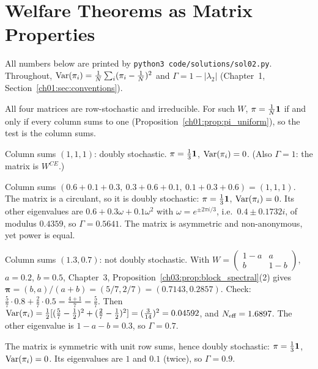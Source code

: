 \documentclass[../solutions_manual.tex]{subfiles}
\begin{document}
\ifSubfilesClassLoaded{\setcounter{chapter}{1}}{}%
\setcounter{chapter}{1}%
\chapter{Welfare Theorems as Matrix Properties}\label{sol02}
\sloppy

All numbers below are printed by \texttt{python3 code/solutions/sol02.py}. Throughout, $\operatorname{Var}(\pi_i) = \frac1N\sum_i(\pi_i - \frac1N)^2$ and $\Gamma = 1 - |\lambda_2|$ (Chapter~1, Section~\ref{ch01:sec:conventions}).


All four matrices are row-stochastic and irreducible. For such $W$, $\pi = \frac1N\mathbf{1}$ if and only if every column sums to one (Proposition~\ref{ch01:prop:pi_uniform}), so the test is the column sums.

 Column sums $(1,1,1)$: doubly stochastic. $\pi = \frac13\mathbf{1}$, $\operatorname{Var}(\pi_i) = 0$. (Also $\Gamma = 1$: the matrix is $W^{CE}$.)

 Column sums $(0.6+0.1+0.3,\ 0.3+0.6+0.1,\ 0.1+0.3+0.6) = (1, 1, 1)$. The matrix is a circulant, so it is doubly stochastic: $\pi = \frac13\mathbf{1}$, $\operatorname{Var}(\pi_i) = 0$. Its other eigenvalues are $0.6 + 0.3\omega + 0.1\omega^2$ with $\omega = e^{\pm 2\pi i/3}$, i.e.\ $0.4 \pm 0.1732i$, of modulus $0.4359$, so $\Gamma = 0.5641$. The matrix is asymmetric and non-anonymous, yet power is equal.

 Column sums $(1.3, 0.7)$: not doubly stochastic. With $W = \begin{pmatrix}1-a & a\\ b & 1-b\end{pmatrix}$, $a = 0.2$, $b = 0.5$, Chapter~3, Proposition~\ref{ch03:prop:block_spectral}(2) gives $\boldsymbol\pi = (b, a)/(a+b) = (5/7, 2/7) = (0.7143, 0.2857)$. Check: $\frac57\cdot0.8 + \frac27\cdot0.5 = \frac{4 + 1}{7} = \frac57$. Then $\operatorname{Var}(\pi_i) = \frac12[(\frac57 - \frac12)^2 + (\frac27 - \frac12)^2] = (\frac{3}{14})^2 = 0.04592$, and $N_{\text{eff}} = 1.6897$. The other eigenvalue is $1 - a - b = 0.3$, so $\Gamma = 0.7$.

 The matrix is symmetric with unit row sums, hence doubly stochastic: $\pi = \frac13\mathbf{1}$, $\operatorname{Var}(\pi_i) = 0$. Its eigenvalues are $1$ and $0.1$ (twice), so $\Gamma = 0.9$.
\end{document}
